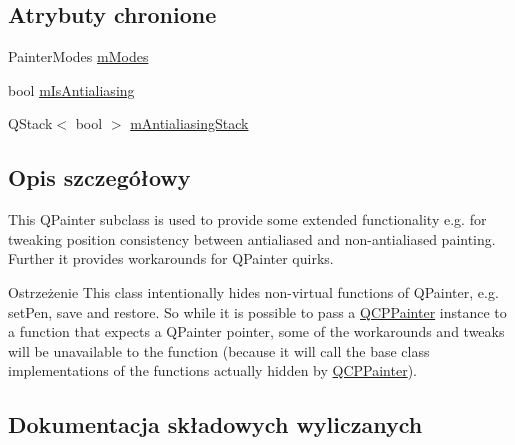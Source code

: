 \subsection*{Atrybuty chronione}
\begin{DoxyCompactItemize}
\item 
Painter\+Modes \hyperlink{class_q_c_p_painter_af5d1d6e5df0adbc7de5633250fb3396c}{m\+Modes}
\item 
bool \hyperlink{class_q_c_p_painter_a7055085da176aee0f6b23298f1003d08}{m\+Is\+Antialiasing}
\item 
Q\+Stack$<$ bool $>$ \hyperlink{class_q_c_p_painter_a0189e641bbf7dc31ac15aef7b36501fa}{m\+Antialiasing\+Stack}
\end{DoxyCompactItemize}


\subsection{Opis szczegółowy}
This Q\+Painter subclass is used to provide some extended functionality e.\+g. for tweaking position consistency between antialiased and non-\/antialiased painting. Further it provides workarounds for Q\+Painter quirks.

\begin{DoxyWarning}{Ostrzeżenie}
This class intentionally hides non-\/virtual functions of Q\+Painter, e.\+g. set\+Pen, save and restore. So while it is possible to pass a \hyperlink{class_q_c_p_painter}{Q\+C\+P\+Painter} instance to a function that expects a Q\+Painter pointer, some of the workarounds and tweaks will be unavailable to the function (because it will call the base class implementations of the functions actually hidden by \hyperlink{class_q_c_p_painter}{Q\+C\+P\+Painter}). 
\end{DoxyWarning}


\subsection{Dokumentacja składowych wyliczanych}
